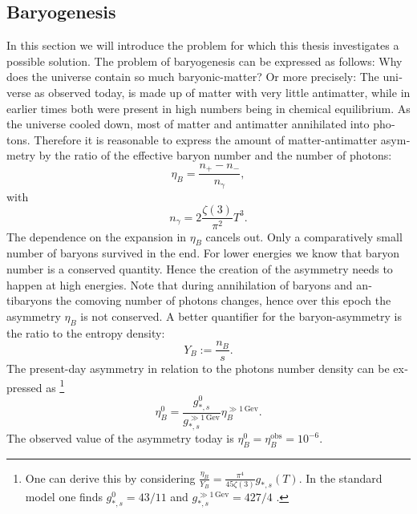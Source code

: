 \documentclass[master,       %
               twoside,        %
               BCOR10mm,       %
               english,ngerman, %
               ]{GAUBM}
\begin{document}
\begin{otherlanguage}{english}
\section{Baryogenesis}
In this section we will introduce the problem for which this thesis investigates a possible solution.
The problem of baryogenesis can be expressed as follows: Why does the universe contain so much baryonic-matter? Or more precisely: The universe as observed today, is made up of matter with very little antimatter, while in earlier times both were present in high numbers being in chemical equilibrium. As the universe cooled down, most of matter and antimatter annihilated into photons. Therefore it is reasonable to express the amount of matter-antimatter asymmetry by the ratio of the effective baryon number and the number of photons:
\begin{equation}
	\eta_B = \frac{n_+ - n_-}{n_\gamma},
\end{equation}
with
\begin{equation}
	n_\gamma = 2 \frac{\zeta(3)}{\pi^2} T^3.
\end{equation}
The dependence on the expansion in $\eta_B$ cancels out.
Only a comparatively small number of baryons survived in the end.
For lower energies we know that baryon number is a conserved quantity. Hence the creation of the asymmetry needs to happen at high energies.
Note that during annihilation of baryons and antibaryons the comoving number of photons changes, hence over this epoch the asymmetry $\eta_B$ is not conserved. A better quantifier for the baryon-asymmetry
is the ratio to the entropy density:
\begin{equation}
	\label{eq:baryon_abundance}
	Y_B := \frac{n_B}{s}.
\end{equation}
The present-day asymmetry in relation to the photons number density can be expressed as \footnote{
One can derive this by considering $\frac{\eta_B}{Y_B} = \frac{\pi^4}{45 \zeta(3)} g_{*, s}(T)$.
In the standard model one finds $g_{*,s}^0 = 43/11$ and $g_{*, s}^{\gg 1 \, \mathrm{Gev}} = 427/4$ \cite[sec. 3.4]{the_early_universe_kolb_and_turner}.
}
\begin{equation}
	\eta_B^0 = \frac{g_{*,s}^0}{g_{*, s}^{\gg 1 \, \mathrm{Gev}}} \eta_B^{\gg 1 \, \mathrm{Gev}}.
\end{equation}
The observed value of the asymmetry today is $\eta_B^0 = \eta_B^\mathrm{obs} = 10^{-6}$.


\end{otherlanguage}
\end{document}
